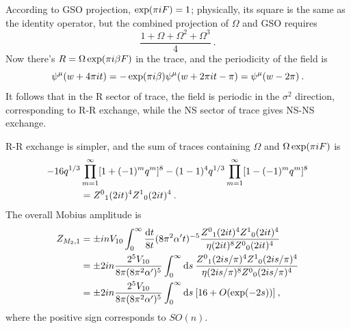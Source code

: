 	According to GSO projection, $\exp(\pi i F)=1$; physically, its square is the same as the identity operator, but the combined projection of $\Omega$ and GSO requires
	\begin{equation}
		\frac{1+\Omega +\Omega^{2}+\Omega^{3}}{4} \:. \label{10.8.15}
	\end{equation}
	Now there's $R=\Omega \exp(\pi i\beta F)$ in the trace, and the periodicity of the field is
	\begin{equation}
		\psi^{\mu}(w+4\pi i t) = -\exp(\pi i\beta)\psi^{\mu}(w+2\pi i t-\pi) =\psi^{\mu}(w-2\pi) \:. \label{10.8.16}
	\end{equation}
	It follows that in the R sector of trace, the field is periodic in the $\sigma^{2}$ direction, corresponding to R-R exchange, while the NS sector of trace gives NS-NS exchange.
	
	R-R exchange is simpler, and the sum of traces containing $\Omega$ and $\Omega\exp(\pi i F)$ is
	\begin{align}
		-16q^{1/3}&\prod_{m=1}^{\infty} [1+(-1)^{m}q^{m}]^{8} 
		-(1-1)^{4}q^{1/3}\prod_{m=1}^{\infty} [1-(-1)^{m}q^{m}]^{8} \nonumber \\
		&= Z^{0}{}_{1}(2i t)^{4} Z^{1}{}_{0}(2i t)^{4} \:. \label{10.8.17}
	\end{align}
	The overall Mobius amplitude is
	\begin{align}
		Z_{M_{2},1}&=\pm i n V_{10} \int_{0}^{\infty} \frac{\mathrm{d} t}{8t}(8\pi^{2}\alpha^{\prime}t)^{-5}
		\frac{Z^{0}{}_{1}(2i t)^{4}Z^{1}{}_{0}(2i t)^{4}}{\eta(2i t)^{8}Z^{0}{}_{0}(2i t)^{4}}\nonumber \\
		&=\pm 2i n \frac{2^{5}V_{10}}{8\pi(8\pi^{2}\alpha^{\prime})^{5}}\int_{0}^{\infty}\mathrm{d} s \:
		\frac{Z^{0}{}_{1}(2i s/\pi)^{4}Z^{1}{}_{0}(2i s/\pi)^{4}}{\eta(2i s/\pi)^{8}Z^{0}{}_{0}(2i s/\pi)^{4}}\nonumber \\
		&=\pm 2i n \frac{2^{5}V_{10}}{8\pi(8\pi^{2}\alpha^{\prime})^{5}}\int_{0}^{\infty}\mathrm{d} s \:
		[16+O(\exp(-2s))] \:, \label{10.8.18}
	\end{align}
	where the positive sign corresponds to $SO(n)$.
	
